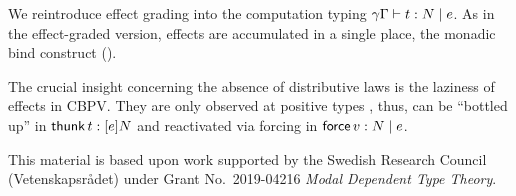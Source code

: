 \documentclass[acmsmall,review,anonymous]{acmart}\settopmatter{printfolios=true,printccs=false,printacmref=false}
\begin{document}
We reintroduce effect grading into the computation typing
$\qeCompTy \gamma \Gamma t e N$.  As in the effect-graded version,
effects are accumulated in a single place, the monadic bind construct
(\relim\diamond).

The crucial insight concerning the absence of distributive laws is the
laziness of effects in CBPV.  They are only observed at positive
types \citep{levy:hosc06},
thus, can be ``bottled up'' in $\thunk t : \thunkty e N$ and
reactivated via forcing in $\force v : N \mid e$.


\begin{acks}                            %

  This material is based upon work supported by the
  Swedish Research Council (Vetenskapsrådet)
  under Grant
  No.~2019-04216 \emph{Modal Dependent Type Theory}.

\end{acks}






\end{document}
